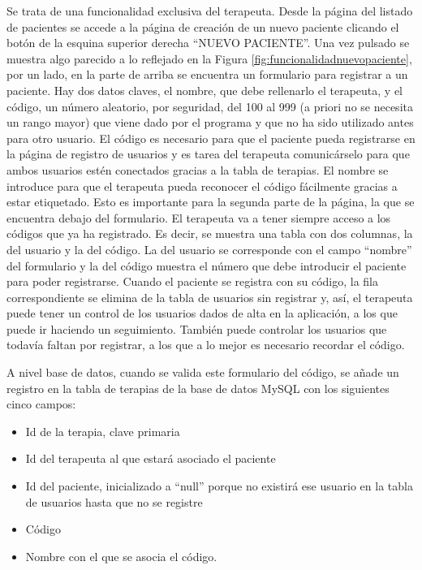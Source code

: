 Se trata de una funcionalidad exclusiva del terapeuta. Desde la página del listado de pacientes se accede a la página de creación de un nuevo paciente clicando el botón de la esquina superior derecha ``NUEVO PACIENTE''. Una vez pulsado se muestra algo parecido a lo reflejado en la Figura \ref{fig:funcionalidadnuevopaciente}, por un lado, en la parte de arriba se encuentra un formulario para registrar a un paciente. Hay dos datos claves, el nombre, que debe rellenarlo el terapeuta, y el código, un número aleatorio, por seguridad, del 100 al 999 (a priori no se necesita un rango mayor) que viene dado por el programa y que no ha sido utilizado antes para otro usuario. El código es necesario para que el paciente pueda registrarse en la página de registro de usuarios y es tarea del terapeuta comunicárselo para que ambos usuarios estén conectados gracias a la tabla de terapias. El nombre se introduce para que el terapeuta pueda reconocer el código fácilmente gracias a estar etiquetado. Esto es importante para la segunda parte de la página, la que se encuentra debajo del formulario. El terapeuta va a tener siempre acceso a los códigos que ya ha registrado. Es decir, se muestra una tabla con dos columnas, la del usuario y la del código. La del usuario se corresponde con el campo ``nombre'' del formulario y la del código muestra el número que debe introducir el paciente para poder registrarse. Cuando el paciente se registra con su código, la fila correspondiente se elimina de la tabla de usuarios sin registrar y, así, el terapeuta puede tener un control de los usuarios dados de alta en la aplicación, a los que puede ir haciendo un seguimiento. También puede controlar los usuarios que todavía faltan por registrar, a los que a lo mejor es necesario recordar el código. 

A nivel base de datos, cuando se valida este formulario del código, se añade un registro en la tabla de terapias de la base de datos MySQL con los siguientes cinco campos: 
\begin{itemize}
	\item Id de la terapia, clave primaria
	\item Id del terapeuta al que estará asociado el paciente
	\item Id del paciente, inicializado a ``null'' porque no existirá ese usuario en la tabla de usuarios hasta que no se registre
	\item Código
	\item Nombre con el que se asocia el código.
\end{itemize}

